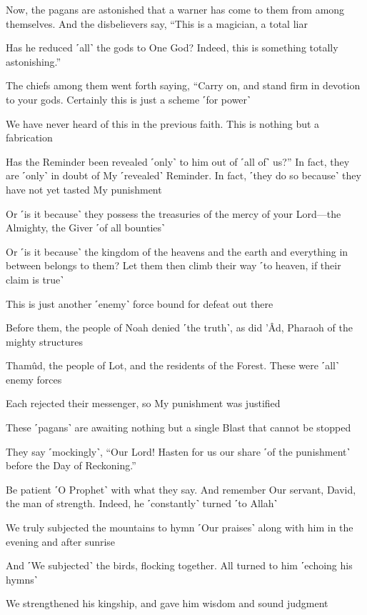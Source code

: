 Now, the pagans are astonished that a warner has come to them from among themselves. And the disbelievers say, “This is a magician, a total liar

Has he reduced ˹all˺ the gods to One God? Indeed, this is something totally astonishing.”

The chiefs among them went forth saying, “Carry on, and stand firm in devotion to your gods. Certainly this is just a scheme ˹for power˺

We have never heard of this in the previous faith. This is nothing but a fabrication

Has the Reminder been revealed ˹only˺ to him out of ˹all of˺ us?” In fact, they are ˹only˺ in doubt of My ˹revealed˺ Reminder. In fact, ˹they do so because˺ they have not yet tasted My punishment

Or ˹is it because˺ they possess the treasuries of the mercy of your Lord—the Almighty, the Giver ˹of all bounties˺

Or ˹is it because˺ the kingdom of the heavens and the earth and everything in between belongs to them? Let them then climb their way ˹to heaven, if their claim is true˺

This is just another ˹enemy˺ force bound for defeat out there

Before them, the people of Noah denied ˹the truth˺, as did ’Âd, Pharaoh of the mighty structures

Thamûd, the people of Lot, and the residents of the Forest. These were ˹all˺ enemy forces

Each rejected their messenger, so My punishment was justified

These ˹pagans˺ are awaiting nothing but a single Blast that cannot be stopped

They say ˹mockingly˺, “Our Lord! Hasten for us our share ˹of the punishment˺ before the Day of Reckoning.”

Be patient ˹O Prophet˺ with what they say. And remember Our servant, David, the man of strength. Indeed, he ˹constantly˺ turned ˹to Allah˺

We truly subjected the mountains to hymn ˹Our praises˺ along with him in the evening and after sunrise

And ˹We subjected˺ the birds, flocking together. All turned to him ˹echoing his hymns˺

We strengthened his kingship, and gave him wisdom and sound judgment

